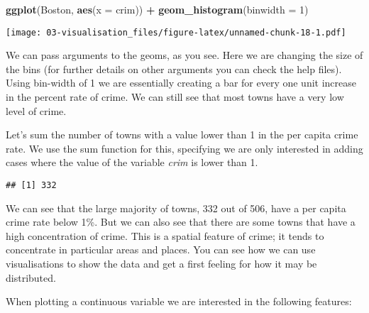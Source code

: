 \documentclass[
]{book}
\newenvironment{Shaded}{\begin{snugshade}}{\end{snugshade}}
\newcommand{\AttributeTok}[1]{\textcolor[rgb]{0.13,0.29,0.53}{#1}}
\newcommand{\DecValTok}[1]{\textcolor[rgb]{0.00,0.00,0.81}{#1}}
\newcommand{\FunctionTok}[1]{\textcolor[rgb]{0.13,0.29,0.53}{\textbf{#1}}}
\newcommand{\NormalTok}[1]{#1}
\newcommand{\SpecialCharTok}[1]{\textcolor[rgb]{0.81,0.36,0.00}{\textbf{#1}}}
\begin{document}
\begin{Shaded}
\begin{Highlighting}[]
\FunctionTok{ggplot}\NormalTok{(Boston, }\FunctionTok{aes}\NormalTok{(}\AttributeTok{x =}\NormalTok{ crim)) }\SpecialCharTok{+}
  \FunctionTok{geom\_histogram}\NormalTok{(}\AttributeTok{binwidth =} \DecValTok{1}\NormalTok{) }
\end{Highlighting}
\end{Shaded}

\texttt{[image: 03-visualisation\_files/figure-latex/unnamed-chunk-18-1.pdf]}

We can pass arguments to the geoms, as you see. Here we are changing the size of the bins (for further details on other arguments you can check the help files). Using bin-width of 1 we are essentially creating a bar for every one unit increase in the percent rate of crime. We can still see that most towns have a very low level of crime.

Let's sum the number of towns with a value lower than 1 in the per capita crime rate. We use the sum function for this, specifying we are only interested in adding cases where the value of the variable \emph{crim} is lower than 1.

\begin{Shaded}
\end{Shaded}

\begin{verbatim}
## [1] 332
\end{verbatim}

We can see that the large majority of towns, 332 out of 506, have a per capita crime rate below 1\%. But we can also see that there are some towns that have a high concentration of crime. This is a spatial feature of crime; it tends to concentrate in particular areas and places. You can see how we can use visualisations to show the data and get a first feeling for how it may be distributed.

When plotting a continuous variable we are interested in the following features:
\end{document}
